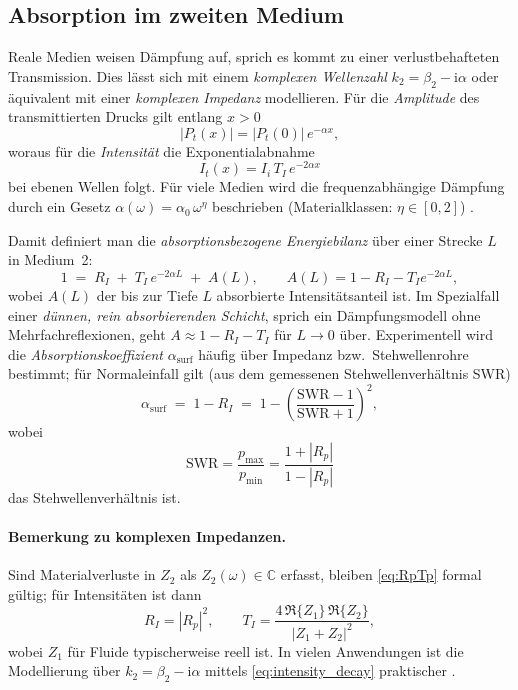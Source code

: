 \subsection{Absorption im zweiten Medium}
Reale Medien weisen Dämpfung auf, sprich es kommt zu einer
verlustbehafteten Transmission.
Dies lässt sich mit einem \emph{komplexen Wellenzahl}
\(
    k_2 = \beta_2 - \mathrm{i}\alpha
\)
oder äquivalent mit einer \emph{komplexen Impedanz} modellieren.
Für die \emph{Amplitude} des transmittierten Drucks gilt entlang $x>0$
\[
    |P_t(x)| = |P_t(0)|\,e^{-\alpha x},
\]
woraus für die \emph{Intensität} die Exponentialabnahme
\begin{equation}
    I_t(x)=I_i\,T_I\,e^{-2\alpha x}
    \label{eq:intensity_decay}
\end{equation}
bei ebenen Wellen folgt.
Für viele Medien wird die frequenzabhängige Dämpfung durch ein Gesetz
$\alpha(\omega)=\alpha_0\,\omega^\eta$ beschrieben
(Materialklassen: $\eta\in[0,2]$) \cite{schall:allenAbsorption}.

Damit definiert man die \emph{absorptionsbezogene Energiebilanz} über einer Strecke $L$ in Medium~2:
\begin{equation}
    1 \;=\; R_I \;+\; T_I\,e^{-2\alpha L} \;+\; A(L),
    \qquad
    A(L)=1-R_I - T_I e^{-2\alpha L},
    \label{eq:absorption_balance}
\end{equation}
wobei $A(L)$ der bis zur Tiefe $L$ absorbierte Intensitätsanteil ist.
Im Spezialfall einer \emph{dünnen, rein absorbierenden Schicht},
sprich ein Dämpfungs\-modell ohne Mehrfachreflexionen, geht
$A \approx 1-R_I-T_I$ für $L\to0$ über.
Experimentell wird die \emph{Absorptionskoeffizient}
$\alpha_\mathrm{surf}$ häufig über Impedanz\- bzw.\ Stehwellen\-rohre
bestimmt; für Normal\-einfall gilt (aus dem gemessenen Stehwellenverhältnis SWR)
\begin{equation}
    \alpha_\mathrm{surf} \;=\; 1 - R_I \;=\; 1 - \left(\frac{\mathrm{SWR}-1}{\mathrm{SWR}+1}\right)^2,
    \label{eq:alpha_SWR}
\end{equation}
wobei
\[
    \mathrm{SWR} = \frac{p_\mathrm{max}}{p_\mathrm{min}} = \frac{1+|R_p|}{1-|R_p|}
\]
das Stehwellenverhältnis ist.

\paragraph{Bemerkung zu komplexen Impedanzen.}
Sind Materialverluste in $Z_2$ als $Z_2(\omega)\in\mathbb{C}$ erfasst,
bleiben \eqref{eq:RpTp} formal gültig; für Intensitäten ist dann
\[
    R_I=\left|R_p\right|^2,\qquad
    T_I=\frac{4\,\Re\{Z_1\}\,\Re\{Z_2\}}{|Z_1+Z_2|^2},
\]
wobei $Z_1$ für Fluide typischerweise reell ist.
In vielen Anwendungen ist die Modellierung über $k_2=\beta_2-\mathrm{i}\alpha$
mittels \eqref{eq:intensity_decay} praktischer \cite{schall:kinsler,schall:allenRT}.

